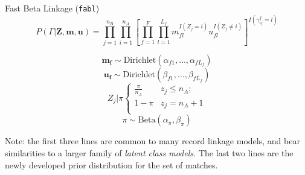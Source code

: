 \documentclass{beamer}
\begin{document}
\begin{frame}{Fast Beta Linkage (\texttt{fabl})}
	$$P(\Gamma|\mathbf{Z}, \mathbf{m}, \mathbf{u}) = \prod_{j=1}^{n_B}  \prod_{i=1}^{n_A}\left[ \prod_{f=1}^{F}\prod_{l=1}^{L_f} m_{fl}^{I(Z_j = i)}u_{fl}^{I(Z_j \neq i)}\right]^{I(\gamma_{ij}^f = l)}$$
	
	$$\mathbf{m_{f}} \sim \text{Dirichlet}(\alpha_{f1}, \ldots, \alpha_{fL_f})$$
	$$\mathbf{u_{f}} \sim \text{Dirichlet}(\beta_{f1}, \ldots, \beta_{fL_f})$$
	$$Z_j | \pi	\begin{cases} 
	\frac{\pi}{n_A}  & z_j \leq n_A; \\
	1-\pi &  z_j  = n_A + 1 \\
	\end{cases}$$
	$$\pi \sim \text{Beta}(\alpha_{\pi}, \beta_{\pi})$$
	
	Note: the first three lines are common to many record linkage models, and bear similarities to a larger family of \textit{latent class models.} The last two lines are the newly developed prior distribution for the set of matches.  
\end{frame}
\end{document}
